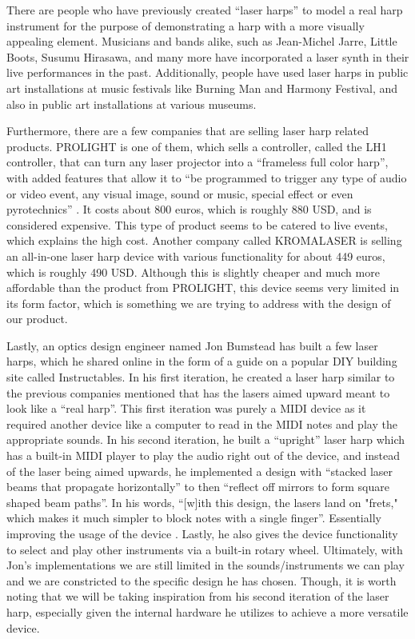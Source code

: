 There are people who have previously created “laser harps” to model a real harp instrument for the purpose of demonstrating a harp with a more visually appealing element. Musicians and bands alike, such as Jean-Michel Jarre, Little Boots, Susumu Hirasawa, and many more have incorporated a laser synth in their live performances in the past. Additionally, people have used laser harps in public art installations at music festivals like Burning Man and Harmony Festival, and also in public art installations at various museums.

Furthermore, there are a few companies that are selling laser harp related products. PROLIGHT is one of them, which sells a controller, called the LH1 controller, that can turn any laser projector into a “frameless full color harp”, with added features that allow it to “be programmed to trigger any type of audio or video event, any visual image, sound or music, special effect or even pyrotechnics” \cite{PROLIGHT 2019}. It costs about 800 euros, which is roughly 880 USD, and is considered expensive. This type of product seems to be catered to live events, which explains the high cost. Another company called KROMALASER is selling an all-in-one laser harp device with various functionality for about 449 euros, which is roughly 490 USD. Although this is slightly cheaper and much more affordable than the product from PROLIGHT, this device seems very limited in its form factor, which is something we are trying to address with the design of our product.

Lastly, an optics design engineer named Jon Bumstead has built a few laser harps, which he shared online in the form of a guide on a popular DIY building site called Instructables. In his first iteration, he created a laser harp similar to the previous companies mentioned that has the lasers aimed upward meant to look like a “real harp”. This first iteration was purely a MIDI device as it required another device like a computer to read in the MIDI notes and play the appropriate sounds. In his second iteration, he built a “upright” laser harp which has a built-in MIDI player to play the audio right out of the device, and instead of the laser being aimed upwards, he implemented a design with “stacked laser beams that propagate horizontally” to then “reflect off mirrors to form square shaped beam paths”. In his words, “[w]ith this design, the lasers land on "frets," which makes it much simpler to block notes with a single finger”. Essentially improving the usage of the device \cite{Bumstead2019}. Lastly, he also gives the device functionality to select and play other instruments via a built-in rotary wheel. Ultimately, with Jon’s implementations we are still limited in the sounds/instruments we can play and we are constricted to the specific design he has chosen. Though, it is worth noting that we will be taking inspiration from his second iteration of the laser harp, especially given the internal hardware he utilizes to achieve a more versatile device.

